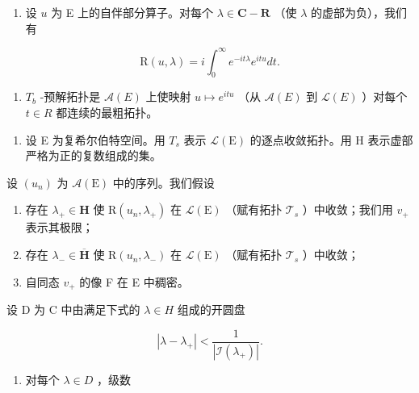 \begin{enumerate}
\def\labelenumi{\alph{enumi})}
\tightlist
\item
  设 \(u\) 为 E 上的自伴部分算子。对每个 \(\lambda \in \mathbf{C} - \mathbf{R}\) （使 \(\lambda\) 的虚部为负），我们有
\end{enumerate}

\[
\mathrm{R} (u, \lambda) = i \int_ {0} ^ {\infty} e ^ {- i t \lambda} e ^ {i t u} d t.
\]

\begin{enumerate}
\def\labelenumi{\alph{enumi})}
\setcounter{enumi}{1}
\tightlist
\item
  \(T_{b}\) -预解拓扑是 \(\mathcal{A}(E)\) 上使映射 \(u \mapsto e^{itu}\) （从 \(\mathcal{A}(E)\) 到 \(\mathcal{L}(E)\) ）对每个 \(t \in R\) 都连续的最粗拓扑。
\end{enumerate}

\begin{enumerate}
\def\labelenumi{\arabic{enumi})}
\setcounter{enumi}{30}
\tightlist
\item
  设 E 为复希尔伯特空间。用 \(T_{s}\) 表示 \(\mathcal{L}(\mathrm{E})\) 的逐点收敛拓扑。用 H 表示虚部严格为正的复数组成的集。
\end{enumerate}

设 \((u_{n})\) 为 \(\mathcal{A}(\mathrm{E})\) 中的序列。我们假设

\begin{enumerate}
\def\labelenumi{(\roman{enumi})}
\item
  存在 \(\lambda_{+} \in \mathbf{H}\) 使 \(\mathrm{R}(u_n, \lambda_{+})\) 在 \(\mathcal{L}(\mathrm{E})\) （赋有拓扑 \(\mathcal{T}_s\) ）中收敛；我们用 \(v_{+}\) 表示其极限；
\item
  存在 \(\lambda_{-} \in \overline{\mathbf{H}}\) 使 \(\mathrm{R}(u_n, \lambda_{-})\) 在 \(\mathcal{L}(\mathrm{E})\) （赋有拓扑 \(\mathcal{T}_s\) ）中收敛；
\item
  自同态 \(v_{+}\) 的像 F 在 E 中稠密。
\end{enumerate}

设 D 为 C 中由满足下式的 \(\lambda \in H\) 组成的开圆盘

\[
| \lambda - \lambda_ {+} | <   \frac {1}{| \mathcal {I} (\lambda_ {+}) |}.
\]

\begin{enumerate}
\def\labelenumi{\alph{enumi})}
\tightlist
\item
  对每个 \(\lambda \in D\) ，级数
\end{enumerate}

